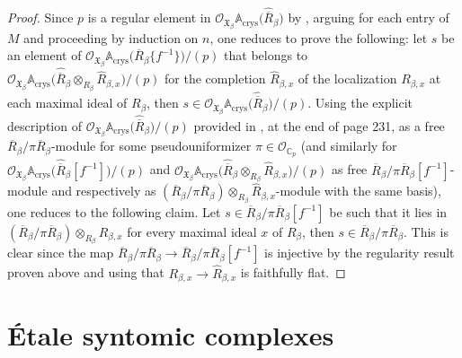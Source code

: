 \documentclass[asterisque,english]{smfart}
\begin{document}
\begin{proof}
Since $p$ is a regular element in $ \mathcal{O}_{\mathfrak{X}_\beta}\mathbb{A}_{\mathrm{crys}}\bigl(\widehat{\overline{R}}_\beta\bigr)$ by \cite[Cor.~3.27]{AI}, arguing for each entry of $M$ and proceeding by induction on $n$, one reduces to prove the following: let $s$  be an element of $ \mathcal{O}_{\mathfrak{X}_\beta}\mathbb{A}_{\mathrm{crys}}\bigl(\overline{R}_\beta\{f^{-1}\}\bigr)/(p)$ that belongs to $ \mathcal{O}_{\mathfrak{X}_\beta}\mathbb{A}_{\mathrm{crys}}\bigl(\widehat{\overline{R}}_\beta\otimes_{R_\beta} \widehat{R}_{\beta,x}\bigr)/(p)$ for the completion $\widehat{R}_{\beta,x}$ of the localization $R_{\beta,x}$ at each maximal ideal of $R_\beta$, then $s\in  \mathcal{O}_{\mathfrak{X}_\beta}\mathbb{A}_{\mathrm{crys}}\bigl(\widehat{\overline{R}}_\beta\bigr)/(p)$. Using the explicit description of  $ \mathcal{O}_{\mathfrak{X}_\beta}\mathbb{A}_{\mathrm{crys}}\bigl(\widehat{\overline{R}}_\beta\bigr)/(p)$ provided in \cite[Lemma 3.25]{AI}, at the end of page 231, as a free $\overline{R}_\beta/\pi \overline{R}_\beta$-module for some pseudouniformizer $\pi \in \mathcal{O}_{\mathbb{C}_p}$ (and similarly for $ \mathcal{O}_{\mathfrak{X}_\beta}\mathbb{A}_{\mathrm{crys}}\bigl(\widehat{\overline{R}}_\beta[f^{-1}]\bigr)/(p)$ and $\mathcal{O}_{\mathfrak{X}_\beta}\mathbb{A}_{\mathrm{crys}}\bigl(\widehat{\overline{R}}_\beta\otimes_{R_\beta} \widehat{R}_{\beta,x}\bigr)/(p)$ as free $\overline{R}_\beta/\pi \overline{R}_\beta[f^{-1}]$-module and respectively as $(\overline{R}_\beta/\pi\overline{R}_\beta )\otimes_{R_\beta} \widehat{R}_{\beta,x}$-module with the same basis), one reduces to the following claim.  Let $s\in \overline{R}_\beta/\pi \overline{R}_\beta[f^{-1}]$ be such that it lies in $(\overline{R}_\beta/\pi \overline{R}_\beta)\otimes_{R_\beta} \widehat{R}_{\beta,x}$ for every maximal ideal $x$ of $R_\beta$, then $s\in \overline{R}_\beta/\pi \overline{R}_\beta$. This is clear since the map $\overline{R}_\beta/\pi \overline{R}_\beta\to\overline{R}_\beta/\pi \overline{R}_\beta[f^{-1}]$ is injective by the regularity result proven above and using that $R_{\beta,x}\to \widehat{R}_{\beta,x}$ is faithfully flat.
\end{proof}

\section{\'Etale syntomic complexes}\label{sec:synL}
\end{document}
